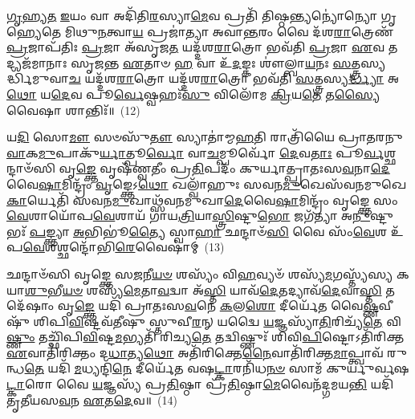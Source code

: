 {%
\-\ul{𑌗𑍃}\-\-\ul{𑌹𑍍𑌯}\-\-\ul{𑌤} \ul{𑌇}\-𑌯𑌂 𑌵𑌾 𑌅𑌦𑌿᳴𑌤𑌿\-\ul{𑌰}\-𑌸𑍍𑌯𑌾\-\ul{𑌮𑍇}\-𑌵 𑌪𑍍𑌰𑌤𑌿᳴ 𑌤𑌿𑌷𑍍𑌠\-\ul{𑌨𑍍𑌤𑍍𑌯}\-𑌨𑍍𑌯𑍋॑𑌨𑍍𑌯𑍋 𑌗𑍃𑌹𑍍𑌯𑍇𑌤𑍇 𑌮𑌿𑌥𑍁\-\ul{𑌨}\-𑌤𑍍𑌵𑌾\-\ul{𑌯} 𑌪𑍍𑌰𑌜𑌾॑𑌤𑍍𑌯𑌾 𑌅𑌵𑌾\-\ul{𑌨𑍍𑌤}\-𑌰𑌂 𑌵𑍈 𑌦᳴𑌶\-\ul{𑌰𑌾}\-𑌤𑍍𑌰𑍇𑌣᳴ \ul{𑌪𑍍𑌰}\-𑌜𑌾𑌪᳴𑌤𑌿𑌃 \ul{𑌪𑍍𑌰}\-𑌜𑌾 𑌅᳴𑌸𑍃𑌜\-\ul{𑌤} 𑌯𑌦𑍍𑌦᳴𑌶\-\ul{𑌰𑌾}\-𑌤𑍍𑌰𑍋 𑌭𑌵᳴𑌤𑌿 \ul{𑌪𑍍𑌰}\-𑌜𑌾 \ul{𑌏}\-𑌵 𑌤𑌦𑍍𑌯𑌜᳴𑌮𑌾𑌨𑌾𑌃 𑌸𑍃𑌜𑌨𑍍𑌤 \ul{𑌏}\-𑌤𑌾𑍞 \ul{𑌹} 𑌵𑌾 𑌉᳴\-\ul{𑌦}\-𑌙𑍍𑌕𑌃 𑌶𑍗॑𑌲𑍍𑌬𑌾\-\ul{𑌯}\-𑌨𑌃 \ul{𑌸}\-𑌤𑍍𑌤𑍍𑌰𑌸𑍍𑌯𑌰𑍍𑌦𑍍𑌧𑌿᳴𑌮𑍁𑌵𑌾\-\ul{𑌚} 𑌯𑌦𑍍𑌦᳴𑌶\-\ul{𑌰𑌾}\-𑌤𑍍𑌰𑍋 𑌯𑌦𑍍𑌦᳴𑌶\-\ul{𑌰𑌾}\-𑌤𑍍𑌰𑍋 𑌭𑌵᳴𑌤𑌿 \ul{𑌸}\-𑌤𑍍𑌤𑍍𑌰𑌸𑍍𑌯\-\ul{𑌰𑍍𑌦𑍍𑌧𑍍𑌯𑌾} 𑌅\-\ul{𑌥𑍋} 𑌯\-\ul{𑌦𑍇}\-𑌵 𑌪𑍂\-\ul{𑌰𑍍𑌵𑍇}\-𑌷𑍍𑌵𑌹𑌃᳴\-\ul{𑌸𑍁} 𑌵𑌿𑌲𑍋᳴𑌮 \ul{𑌕𑍍𑌰𑌿}\-𑌯\-\ul{𑌤𑍇} 𑌤\-\ul{𑌸𑍍𑌯𑍈}\-𑌵𑍈𑌷𑌾 𑌶𑌾𑌨𑍍𑌤𑌿𑌃᳴॥~(12)

{\anuvakamend[{\-\ul{𑌆}\-\-\ul{𑌦𑌿}\-𑌤𑍍𑌯𑌸𑍍𑌤\-\ul{𑌸𑍍𑌯𑍈}\-𑌵 𑌦𑍍𑌵𑍇 𑌚᳴}]}%

𑌯\-\ul{𑌦𑌿} 𑌸𑍋\-\ul{𑌮𑍗} 𑌸𑍞𑌸𑍁᳴\-\ul{𑌤𑍗} 𑌸𑍍𑌯𑌾𑌤𑌾॑𑌮𑍍𑌮\-\ul{𑌹}\-𑌤𑌿 𑌰𑌾𑌤𑍍𑌰𑌿᳴𑌯𑍈 𑌪𑍍𑌰𑌾𑌤𑌰𑌨𑍁\-\ul{𑌵𑌾}\-𑌕\-\ul{𑌮𑍁}\-𑌪𑌾𑌕𑍁᳴\-\ul{𑌰𑍍𑌯𑌾}\-𑌤𑍍𑌪𑍂\-\ul{𑌰𑍍𑌵𑍋} 𑌵𑌾\-\ul{𑌚}\-𑌮𑍍𑌪𑍂𑌰𑍍𑌵𑍋᳴ \ul{𑌦𑍇}\-𑌵\-\ul{𑌤𑌾𑌃} 𑌪𑍂\-\ul{𑌰𑍍𑌵}\-𑌶𑍍𑌛𑌨𑍍𑌦𑌾𑍞᳴𑌸𑌿 𑌵𑍃\-\ul{𑌙𑍍𑌕𑍍𑌤𑍇} 𑌵𑍃𑌷᳴𑌣𑍍𑌵𑌤𑍀𑌂 𑌪𑍍𑌰\-\ul{𑌤𑌿}\-𑌪𑌦𑌂᳴ 𑌕𑍁𑌰𑍍𑌯𑌾𑌤𑍍𑌪𑍍𑌰𑌾𑌤𑌃𑌸\-\ul{𑌵}\-𑌨𑌾\-\ul{𑌦𑍇}\-𑌵𑍈\-\ul{𑌷𑌾}\-𑌮𑌿𑌨𑍍𑌦𑍍𑌰𑌂᳴ \ul{𑌵𑍃}\-𑌙𑍍𑌕𑍍𑌤𑍇\-𑌽\-\ul{𑌥𑍋} 𑌖𑌲𑍍𑌵𑌾᳴𑌹𑍁𑌃 𑌸𑌵𑌨\-\ul{𑌮𑍁}\-𑌖𑍇𑌸᳴𑌵𑌨𑌮𑍁𑌖𑍇 \ul{𑌕𑌾}\-𑌰𑍍𑌯𑍇𑌤𑌿᳴ 𑌸𑌵𑌨\-\ul{𑌮𑍁}\-𑌖𑌾𑌥𑍍𑌸᳴𑌵𑌨𑌮𑍁𑌖𑌾\-\ul{𑌦𑍇}\-𑌵𑍈\-\ul{𑌷𑌾}\-𑌮𑌿𑌨𑍍𑌦𑍍𑌰𑌂᳴ 𑌵𑍃𑌙𑍍𑌕𑍍𑌤𑍇 𑌸𑌂\-\ul{𑌵𑍇}\-𑌶𑌾𑌯𑍋᳴𑌪\-\ul{𑌵𑍇}\-𑌶𑌾𑌯᳴ 𑌗𑌾𑌯\-\ul{𑌤𑍍𑌰𑌿}\-𑌯𑌾\-\ul{𑌸𑍍𑌤𑍍𑌰𑌿}\-𑌷𑍍𑌟𑍁\-\ul{𑌭𑍋} 𑌜𑌗᳴𑌤𑍍𑌯𑌾 𑌅\-\ul{𑌨𑍁}\-𑌷𑍍𑌟𑍁𑌭𑌃᳴ \ul{𑌪}\-𑌙𑍍𑌕𑍍𑌤𑍍𑌯𑌾 \ul{𑌅}\-𑌭𑌿𑌭𑍂॑\-\ul{𑌤𑍍𑌯𑍈} 𑌸𑍍𑌵𑌾\-\ul{𑌹𑌾} 𑌛𑌨𑍍𑌦𑌾𑍞᳴\-\ul{𑌸𑌿} 𑌵𑍈 𑌸𑌂᳴\-\ul{𑌵𑍇}\-𑌶 𑌉᳴𑌪\-\ul{𑌵𑍇}\-𑌶𑌶𑍍𑌛𑌨𑍍𑌦𑍋᳴𑌭𑌿\-\ul{𑌰𑍇}\-𑌵𑍈𑌷𑌾॑𑌮𑍍~(13)

𑌛𑌨𑍍𑌦𑌾𑍞᳴𑌸𑌿 𑌵𑍃𑌙𑍍𑌕𑍍𑌤𑍇 𑌸\-\ul{𑌜}\-𑌨𑍀\-\ul{𑌯}\-\-\ul{𑍞} 𑌶𑌸𑍍𑌯𑌂᳴ 𑌵𑌿\-\ul{𑌹}\-𑌵𑍍𑌯𑍞᳴ 𑌶𑌸𑍍𑌯᳴\-\ul{𑌮}\-𑌗𑌸𑍍𑌤𑍍𑌯᳴𑌸𑍍𑌯 𑌕𑌯𑌾\-\ul{𑌶𑍁}\-𑌭𑍀\-\ul{𑌯}\-\-\ul{𑍞} 𑌶𑌸𑍍𑌯᳴\-\ul{𑌮𑍇}\-𑌤𑌾\-\ul{𑌵}\-𑌦𑍍𑌵𑌾 𑌅᳴\-\ul{𑌸𑍍𑌤𑌿} 𑌯𑌾𑌵᳴\-\ul{𑌦𑍇}\-𑌤𑌦𑍍𑌯𑌾𑌵᳴\-\ul{𑌦𑍇}\-𑌵𑌾\-\ul{𑌸𑍍𑌤𑌿} 𑌤𑌦𑍇᳴𑌷𑌾𑌂 𑌵𑍃\-\ul{𑌙𑍍𑌕𑍍𑌤𑍇} 𑌯𑌦𑌿᳴ 𑌪𑍍𑌰𑌾𑌤𑌃𑌸\-\ul{𑌵}\-𑌨𑍇 \ul{𑌕}\-𑌲\-\ul{𑌶𑍋} 𑌦𑍀𑌰𑍍𑌯𑍇᳴𑌤 𑌵𑍈\-\ul{𑌷𑍍𑌣}\-𑌵𑍀𑌷𑍁᳴ 𑌶𑌿𑌪𑌿\-\ul{𑌵𑌿}\-𑌷𑍍𑌟𑌵᳴𑌤𑍀𑌷𑍁 𑌸𑍍𑌤𑍁𑌵𑍀\-\ul{𑌰}\-𑌨𑍍 𑌯𑌦𑍍𑌵𑍈 \ul{𑌯}\-𑌜𑍍𑌞𑌸𑍍𑌯𑌾᳴\-\ul{𑌤𑌿}\-𑌰𑌿𑌚𑍍𑌯᳴\-\ul{𑌤𑍇} 𑌵𑌿\-\ul{𑌷𑍍𑌣𑍁𑌂} 𑌤𑌚𑍍𑌛𑌿᳴𑌪𑌿\-\ul{𑌵𑌿}\-𑌷𑍍𑌟\-\ul{𑌮}\-𑌭𑍍𑌯𑌤𑌿᳴ 𑌰𑌿𑌚𑍍𑌯\-\ul{𑌤𑍇} 𑌤𑌦𑍍𑌵𑌿𑌷𑍍𑌣𑍁𑌃᳴ 𑌶𑌿𑌵𑌿\-\ul{𑌪𑌿}\-𑌷𑍍𑌟𑍋\-𑌽𑌤𑌿᳴𑌰𑌿𑌕𑍍𑌤 \ul{𑌏}\-𑌵𑌾𑌤𑌿᳴𑌰𑌿𑌕𑍍𑌤𑌂 𑌦\-\ul{𑌧𑌾}\-𑌤𑍍𑌯\-\ul{𑌥𑍋} 𑌅𑌤𑌿᳴𑌰𑌿𑌕𑍍𑌤𑍇\-\ul{𑌨𑍈}\-𑌵𑌾𑌤𑌿᳴𑌰𑌿𑌕𑍍𑌤\-\ul{𑌮𑌾}\-𑌪𑍍𑌤𑍍𑌵𑌾𑌵᳴ 𑌰𑍁𑌨𑍍𑌧\-\ul{𑌤𑍇} 𑌯𑌦𑌿᳴ \ul{𑌮}\-𑌧𑍍𑌯𑌨𑍍𑌦𑌿᳴\-\ul{𑌨𑍇} 𑌦𑍀𑌰𑍍𑌯𑍇᳴𑌤 𑌵𑌷\-\ul{𑌟𑍍𑌕𑌾}\-𑌰𑌨𑌿᳴𑌧\-\ul{𑌨}\-\-\ul{𑍞} 𑌸𑌾𑌮᳴ 𑌕𑍁𑌰𑍍𑌯𑍁𑌰𑍍𑌵𑌷\-\ul{𑌟𑍍𑌕𑌾}\-𑌰𑍋 𑌵𑍈 \ul{𑌯}\-𑌜𑍍𑌞𑌸𑍍𑌯᳴ 𑌪𑍍𑌰\-\ul{𑌤𑌿}\-𑌷𑍍𑌠𑌾 𑌪𑍍𑌰᳴\-\ul{𑌤𑌿}\-𑌷𑍍𑌠𑌾\-\ul{𑌮𑍇}\-𑌵𑍈𑌨᳴𑌦𑍍𑌗𑌮𑌯\-\ul{𑌨𑍍𑌤𑌿} 𑌯𑌦𑌿᳴ 𑌤𑍃𑌤𑍀𑌯𑌸\-\ul{𑌵}\-𑌨 \ul{𑌏}\-𑌤\-\ul{𑌦𑍇}\-𑌵॥~(14)


{\anuvakamend[{𑌛𑌨𑍍𑌦𑍋᳴𑌭𑌿\-\ul{𑌰𑍇}\-𑌵𑍈\-\ul{𑌷𑌾}\-𑌮𑌵𑍈\-\ul{𑌕𑌾}\-𑌨𑍍𑌨𑌵𑌿𑍞᳴\-\ul{𑌶}\-𑌤𑌿𑌶𑍍𑌚᳴}]}%

}
